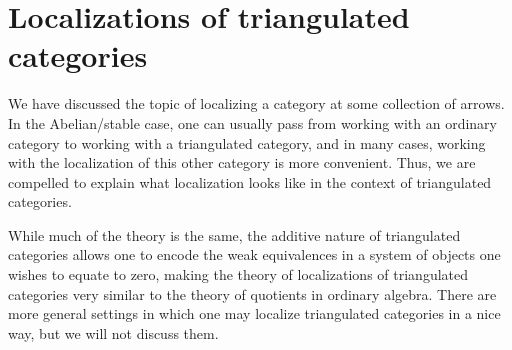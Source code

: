 
\section{Localizations of triangulated categories}
We have discussed the topic of localizing a category at some collection of arrows. In the Abelian/stable case, one can usually pass from working with an ordinary category to working with
a triangulated category, and in many cases, working with the localization of this other category is more convenient. Thus, we are compelled to explain what localization looks like in the
context of triangulated categories.

While much of the theory is the same, the additive nature of triangulated categories allows one to encode the weak equivalences in a system of objects one wishes to equate to zero,
making the theory of localizations of triangulated categories very similar to the theory of quotients in ordinary algebra. There are more general settings in which one may localize
triangulated categories in a nice way, but we will not discuss them.

